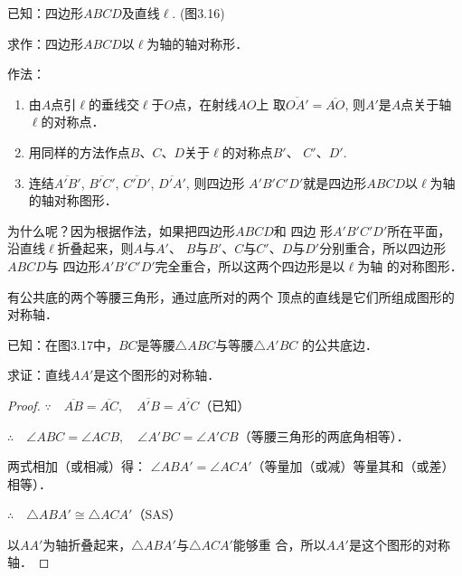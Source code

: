 \begin{example}
已知：四边形$ABCD$及直线$\ell$. (图3.16)

求作：四边形$ABCD$以$\ell$为轴的轴对称形．

作法：
\begin{enumerate}
\item 由$A$点引$\ell$的垂线交$\ell$于$O$点，在射线$AO$上
取$\overline{OA'}=\overline{AO}$, 则$A'$是$A$点关于轴$\ell$的对称点．
\item 用同样的方法作点$B$、$C$、$D$关于$\ell$的对称点$B'$、
$C'$、$D'$.
\item 连结$\overline{A'B'}$, $\overline{B'C'}$, $\overline{C'D'}$, $\overline{D'A'}$, 则四边形
$A'B'C'D'$就是四边形$ABCD$以$\ell$为轴的轴对称图形．
\end{enumerate}

为什么呢？因为根据作法，如果把四边形$ABCD$和 四边
形$A'B'C'D'$所在平面，沿直线$\ell$折叠起来，则$A$与$A'$、
$B$与$B'$、$C$与$C'$、$D$与$D'$分别重合，所以四边形$ABCD$与
四边形$A'B'C'D'$完全重合，所以这两个四边形是以$\ell$为轴
的对称图形．
\end{example}

\begin{example}
    有公共底的两个等腰三角形，通过底所对的两个
顶点的直线是它们所组成图形的对称轴．

已知：在图3.17中，$BC$是等腰$\triangle ABC$与等腰$\triangle A'BC$
的公共底边．

求证：直线$AA'$是这个图形的对称轴．
\end{example}

\begin{figure}[htp]
    \centering
{}
    \caption{}
\end{figure}

\begin{proof}
$\because\quad \overline{AB}=\overline{AC},\quad \overline{A'B}=\overline{A'C}$（已知）

$\therefore\quad \angle ABC=\angle ACB,\quad 
\angle A'BC=\angle A'CB$（等腰三角形的两底角相等）．

两式相加（或相减）得：
$\angle ABA'=\angle ACA'$（等量加（或减）等量其和（或差）
相等）．

$\therefore\quad \triangle ABA'\cong \triangle ACA'$（SAS）

以$AA'$为轴折叠起来，$\triangle ABA'$与$\triangle ACA'$能够重
合，所以$AA'$是这个图形的对称轴．
\end{proof}

